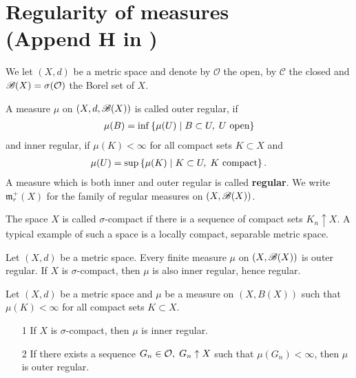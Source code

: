 \section{Regularity of measures \protect\\ (Append H in \cite{schilling2017measures})}

We let $(X,d)$ be a metric space and denote by $\mathcal O$ the open, by $\mathcal C$ the closed and $\mathscr{B}(X)=\sigma(\mathcal O)$ the Borel set of $X$.

\begin{definition}
    A measure $\mu$ on $(X,d,\mathscr{B}(X))$ is called outer regular, if \begin{align}
        \mu(B) = \inf\left\{\mu(U)\hspace{1mm}|\hspace{1mm} B\subset U,\hspace{1mm} U \text{ open} \right\}
    \end{align}
    and inner regular, if $\mu(K)<\infty$ for all compact sets $K\subset X$ and \begin{align}
        \mu(U) = \sup\left\{\mu(K)\hspace{1mm}|\hspace{1mm} K\subset U,\hspace{1mm} K \text{ compact} \right\}.
    \end{align}
    A measure which is both inner and outer regular is called \textbf{regular}. We write $\mathfrak m_r^+(X)$ for the family of 
    regular measures on $(X,\mathscr{B}(X))$.
\end{definition}

\begin{remark}
    The space $X$ is called $\sigma$-compact if there is a sequence of compact sets $K_n\uparrow X$. A typical example of such a space 
    is a locally compact, separable metric space.
\end{remark}

\begin{theorem}
    Let $(X,d)$ be a metric space. Every finite measure $\mu$ on $(X,\mathscr{B}(X))$ is outer regular. If $X$ is $\sigma$-compact, then $\mu$ is also inner regular, hence regular.
\end{theorem}
\begin{theorem}
    Let $(X,d)$ be a metric space and $\mu$ be a measure on $(X,B(X))$ such that $\mu(K)<\infty$ for all compact sets $K\subset X$.
\end{theorem}
\begin{itemize}
    \item[1] If $X$ is $\sigma$-compact, then $\mu$ is inner regular.
    \item[2] If there exists a sequence $G_n\in\mathcal O,\hspace{1mm} G_n\uparrow X$ such that $\mu(G_n)<\infty$, then $\mu$ is outer regular.   
\end{itemize}